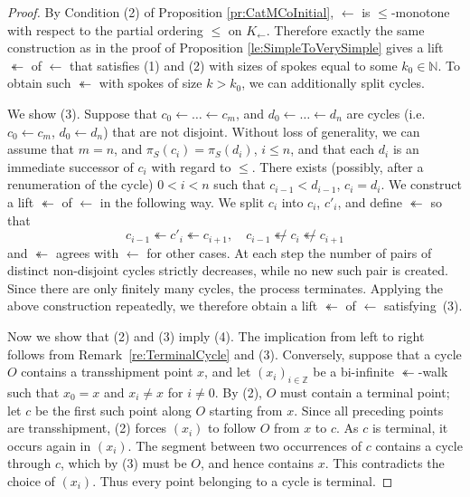 \documentclass[12pt]{amsart}
\numberwithin{equation}{section}
\theoremstyle{plain}
\theoremstyle{definition}
\newcommand \la{\leftarrow}
\newcommand \tla{\twoheadleftarrow}
\newcommand \NN{\mathbb{N}}
\begin{document}
\begin{proof}
	By Condition (2) of Proposition \ref{pr:CatMCoInitial}, $\la$ is $\leq$-monotone with respect to the partial ordering $\leq$ on $K_\la$.  Therefore exactly the same construction as in the proof of Proposition \ref{le:SimpleToVerySimple} gives a lift $\tla$ of $\la$ that satisfies (1) and (2) with sizes of spokes equal to some $k_0 \in \NN$. To obtain such $\tla$ with spokes of size $k>k_0$, we can additionally split cycles.
	
	We show (3). Suppose that $c_0 \la \ldots \la c_m$,  and $d_0 \la  \ldots \la d_n$ are cycles (i.e. $c_0 \la c_m$, $d_0 \la d_n$) that are not disjoint. Without loss of generality, we can assume that $m=n$, and $\pi_S(c_i)=\pi_S(d_i)$, $i \leq n$, and that each $d_i$ is an immediate successor of $c_i$ with regard to $\leq$. There exists (possibly, after a renumeration of the cycle) $0<i<n$ such that $c_{i-1}<d_{i-1}$, $c_i=d_i$. We construct a lift $\tla$ of $\la$ in the following way. We split $c_i$ into $c_i$, $c'_i$, and define $\tla$ so that $$c_{i-1} \tla c'_i \tla c_{i+1}, \quad c_{i-1} \not \tla c_i \not \tla c_{i+1}$$ and $\tla$ agrees with $\la$ for other cases. At each step the number of pairs of distinct non-disjoint cycles
	strictly decreases, while no new such pair is created. Since there are
	only finitely many cycles, the process terminates. Applying the above
	construction repeatedly, we therefore obtain a lift $\tla$ of $\la$
	satisfying~(3).
	

Now we show that (2) and (3) imply (4). The implication from left to right follows from Remark~\ref{re:TerminalCycle} and (3). Conversely, suppose that a cycle $O$ contains a transshipment point $x$, and let $(x_i)_{i\in\mathbb Z}$ be a bi-infinite $\tla$-walk such that $x_0=x$ and $x_i\neq x$ for $i\neq0$. By (2), $O$ must contain a terminal point; let $c$ be the first such point along $O$ starting from $x$. Since all preceding points are transshipment, (2) forces $(x_i)$ to follow $O$ from $x$ to $c$. As $c$ is terminal, it occurs again in $(x_i)$. The segment between two occurrences of $c$ contains a cycle through $c$, which by (3) must be $O$, and hence contains $x$. This contradicts the choice of $(x_i)$. Thus every point belonging to a cycle is terminal.


\end{proof}
\end{document}
